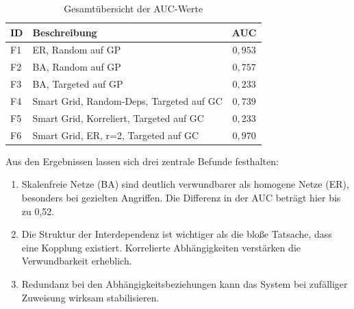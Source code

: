 \begin{table}[H]
\centering
\caption{Gesamtübersicht der AUC-Werte}
\label{tab:zusammenfassung}
\begin{tabular}{llc}
\hline
\textbf{ID} & \textbf{Beschreibung} & \textbf{AUC} \\
\hline
F1 & ER, Random auf GP & $0{,}953$ \\
F2 & BA, Random auf GP & $0{,}757$ \\
F3 & BA, Targeted auf GP & $0{,}233$ \\
F4 & Smart Grid, Random-Deps, Targeted auf GC & $0{,}739$ \\
F5 & Smart Grid, Korreliert, Targeted auf GC & $0{,}233$ \\
F6 & Smart Grid, ER, r=2, Targeted auf GC & $0{,}970$ \\
\hline
\end{tabular}
\end{table}

Aus den Ergebnissen lassen sich drei zentrale Befunde festhalten:

\begin{enumerate}
    \item Skalenfreie Netze (BA) sind deutlich verwundbarer als homogene Netze (ER), besonders bei gezielten Angriffen. Die Differenz in der AUC beträgt hier bis zu 0,52.
    
    \item Die Struktur der Interdependenz ist wichtiger als die bloße Tatsache, dass eine Kopplung existiert. Korrelierte Abhängigkeiten verstärken die Verwundbarkeit erheblich.
    
    \item Redundanz bei den Abhängigkeitsbeziehungen kann das System bei zufälliger Zuweisung wirksam stabilisieren. 
\end{enumerate}
